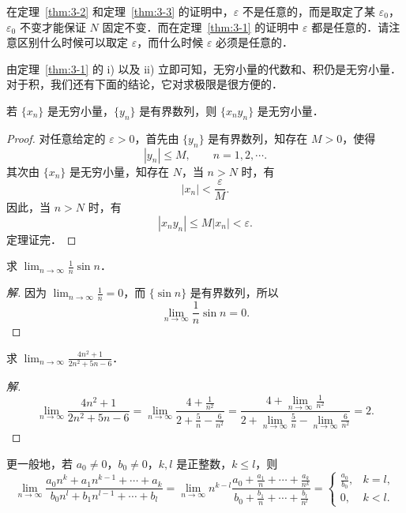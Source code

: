 在定理~\ref{thm:3-2} 和定理~\ref{thm:3-3} 的证明中，$\varepsilon$ 不是任意的，而是取定了某 $\varepsilon_0$，$\varepsilon_0$ 不变才能保证 $N$ 固定不变．而在定理~\ref{thm:3-1} 的证明中 $\varepsilon$ 都是任意的．请注意区别什么时候可以取定 $\varepsilon$，而什么时候 $\varepsilon$ 必须是任意的．

由定理~\ref{thm:3-1} 的 i) 以及 ii) 立即可知，无穷小量的代数和、积仍是无穷小量．对于积，我们还有下面的结论，它对求极限是很方便的．

\begin{theorem}\label{thm:3-4}
若 $\{x_n\}$ 是无穷小量，$\{y_n\}$ 是有界数列，则 $\{x_n y_n\}$ 是无穷小量．
\end{theorem}

\begin{proof}
对任意给定的 $\varepsilon>0$，首先由 $\{y_n\}$ 是有界数列，知存在 $M>0$，使得
\[
|y_n| \leqslant M,\qquad n=1,2,\cdots.
\]
其次由 $\{x_n\}$ 是无穷小量，知存在 $N$，当 $n > N$ 时，有
\[
|x_n| < \frac{\varepsilon}{M}.
\]
因此，当 $n > N$ 时，有
\[
|x_n y_n| \leqslant M|x_n| < \varepsilon.
\]
定理证完．
\end{proof}

\begin{example}\label{ex:3-2-10}
求 $\lim_{n\to\infty}\frac{1}{n}\sin n$．
\end{example}

\begin{proof}[解]
因为 $\lim_{n\to\infty}\frac{1}{n} = 0$，而 $\{\sin n\}$ 是有界数列，所以
\[
\lim_{n\to\infty}\frac{1}{n}\sin n = 0.
\]
\end{proof}

\begin{example}\label{ex:3-2-11}
求 $\lim_{n\to\infty}\frac{4n^2+1}{2n^2+5n-6}$．
\end{example}

\begin{proof}[解]
\[
\lim_{n\to\infty}\frac{4n^2+1}{2n^2+5n-6} = \lim_{n\to\infty}\frac{4+\frac{1}{n^2}}{2+\frac{5}{n}-\frac{6}{n^2}} = \frac{4+\lim\limits_{n\to\infty}\frac{1}{n^2}}{2+\lim\limits_{n\to\infty}\frac{5}{n}-\lim\limits_{n\to\infty}\frac{6}{n^2}} = 2.
\]
\end{proof}

更一般地，若 $a_0 \neq 0$，$b_0 \neq 0$，$k,l$ 是正整数，$k \leqslant l$，则
\[
\lim_{n\to\infty}\frac{a_0 n^k + a_1 n^{k-1} + \cdots + a_k}{b_0 n^l + b_1 n^{l-1} + \cdots + b_l} = \lim_{n\to\infty}n^{k-l}\frac{a_0 + \frac{a_1}{n} + \cdots + \frac{a_k}{n^k}}{b_0 + \frac{b_1}{n} + \cdots + \frac{b_l}{n^l}} = \begin{cases}
\frac{a_0}{b_0}, & k = l,\\
0, & k < l.
\end{cases}
\]


